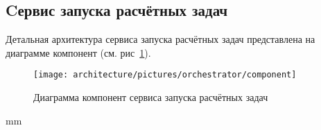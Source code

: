 \subsection{\large{Cервис запуска расчётных задач}}

Детальная архитектура сервиса запуска расчётных задач представлена на диаграмме компонент
(см. рис\ \ref{pic:architecture__orchestrator-component}).

\begin{figure}[H]
	\hspace*{-2.5 cm}\texttt{[image: architecture/pictures/orchestrator/component]}
	\caption{Диаграмма компонент сервиса запуска расчётных задач}
	\label{pic:architecture__orchestrator-component}
\end{figure}
 mm
